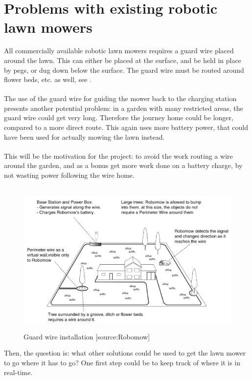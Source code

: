 \section{Problems with existing robotic lawn mowers}
All commercially available robotic lawn mowers requires a guard wire placed around the lawn. This can either be placed at the surface, and be held in place by pegs, or dug down below the surface. The guard wire must be routed around flower beds, etc. as well, see .\\\\
\noindent
The use of the guard wire for guiding the mower back to the charging station presents another potential problem: in a garden with many restricted areas, the guard wire could get very long. Therefore the journey home could be longer, compared to a more direct route. This again uses more battery power, that could have been used for actually mowing the lawn instead.\\\\
\noindent
This will be the motivation for the project: to avoid the work routing a wire around the garden, and as a bonus get more work done on a battery charge, by not wasting power following the wire home.\\\\
\noindent

\begin{figure}[H]
\centering
\includegraphics[scale=0.6]{figures/robomow.png} 
\label{fig:robomow}
\caption{Guard wire installation [source:Robomow]} 
\end{figure}
\noindent

Then, the question is: what other solutions could be used to get the lawn mower to go where it has to go?
One first step could be to keep track of where it is in real-time.

